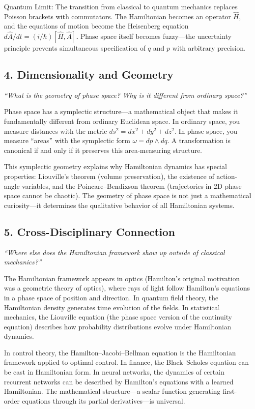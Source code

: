 \documentclass[11pt,openright]{book}
\begin{document}
Quantum Limit: The transition from classical to quantum mechanics replaces Poisson brackets with commutators. The Hamiltonian becomes an operator $\hat{H}$, and the equations of motion become the Heisenberg equation $d\hat{A}/dt = (i/\hbar)[\hat{H}, \hat{A}]$. Phase space itself becomes fuzzy---the uncertainty principle prevents simultaneous specification of $q$ and $p$ with arbitrary precision.

\subsection*{4. Dimensionality and Geometry}
\textit{``What is the geometry of phase space? Why is it different from ordinary space?''}

Phase space has a symplectic structure---a mathematical object that makes it fundamentally different from ordinary Euclidean space. In ordinary space, you measure distances with the metric $ds^2 = dx^2 + dy^2 + dz^2$. In phase space, you measure ``areas'' with the symplectic form $\omega = dp \wedge dq$. A transformation is canonical if and only if it preserves this area-measuring structure.

This symplectic geometry explains why Hamiltonian dynamics has special properties: Liouville's theorem (volume preservation), the existence of action-angle variables, and the Poincare--Bendixson theorem (trajectories in 2D phase space cannot be chaotic). The geometry of phase space is not just a mathematical curiosity---it determines the qualitative behavior of all Hamiltonian systems.

\subsection*{5. Cross-Disciplinary Connection}
\textit{``Where else does the Hamiltonian framework show up outside of classical mechanics?''}

The Hamiltonian framework appears in optics (Hamilton's original motivation was a geometric theory of optics), where rays of light follow Hamilton's equations in a phase space of position and direction. In quantum field theory, the Hamiltonian density generates time evolution of the fields. In statistical mechanics, the Liouville equation (the phase space version of the continuity equation) describes how probability distributions evolve under Hamiltonian dynamics.

In control theory, the Hamilton--Jacobi--Bellman equation is the Hamiltonian framework applied to optimal control. In finance, the Black--Scholes equation can be cast in Hamiltonian form. In neural networks, the dynamics of certain recurrent networks can be described by Hamilton's equations with a learned Hamiltonian. The mathematical structure---a scalar function generating first-order equations through its partial derivatives---is universal.
\end{document}

